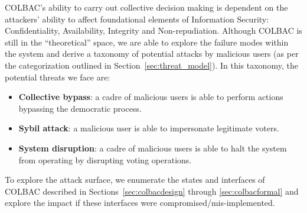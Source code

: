 

COLBAC's ability to carry out collective decision making is dependent on the
attackers' ability to affect foundational elements of Information Security:
Confidentiality, Availability, Integrity and Non-repudiation. Although COLBAC
is still in the ``theoretical'' space, we are able to explore the failure modes
within the system and derive a taxonomy of potential attacks by malicious users (as per the
categorization outlined in Section~\ref{sec:threat_model}). In this taxonomy,
the potential threats we face are:

\begin{itemize}
    \item {\bf Collective bypass}: a cadre of malicious users is able
        to perform actions bypassing the democratic process.

    \item {\bf Sybil attack}: a malicious user is able
        to impersonate legitimate voters.

    \item {\bf System disruption}: a cadre of malicious users is able to halt
        the system from operating by disrupting voting operations.

\end{itemize}

To explore the attack surface, we enumerate the states and interfaces of
COLBAC described in Sections~\ref{sec:colbacdesign} through 
\ref{sec:colbacformal} and explore the impact if these interfaces were
compromised/mis-implemented.\\

